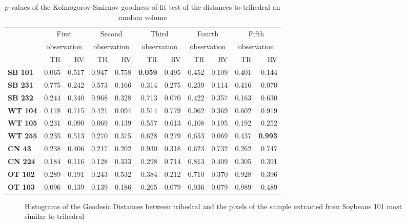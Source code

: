 \documentclass[12pt]{article}
\begin{document}
\begin{table}[hbt]
\centering
\caption{$p$-values of the Kolmogorov-Smirnov goodness-of-fit test of the distances to trihedral an random volume}\label{tab:pvalues_table}
\begin{tabular}{lrrrrrrrrrr}

\toprule
& \multicolumn{2}{c}{First} & \multicolumn{2}{c}{Second} & \multicolumn{2}{c}{Third} & \multicolumn{2}{c}{Fourth} & \multicolumn{2}{c}{Fifth}\\
& \multicolumn{2}{c}{observation} & \multicolumn{2}{c}{observation} & \multicolumn{2}{c}{observation} & \multicolumn{2}{c}{observation} & \multicolumn{2}{c}{observation}\\
& TR & RV & TR & RV & TR & RV & TR & RV& TR & RV\\
\cmidrule(lr){2-11}
\textbf{SB 101} & 0.065 & 0.517 & 0.947 & 0.758 & \textbf{0.059} & 0.495 & 0.452 & 0.109 & 0.401 & 0.144\\
\textbf{SB 231} & 0.775 & 0.242 & 0.573 & 0.166 & 0.314 & 0.275 & 0.239 & 0.114 & 0.416 & 0.070\\
\textbf{SB 232} & 0.244 & 0.340 & 0.968 & 0.328 & 0.713 & 0.070 & 0.422 & 0.357 & 0.163 & 0.630\\
\textbf{WT 104} & 0.178 & 0.715 & 0.421 & 0.094 & 0.514 & 0.779 & 0.062 & 0.369 & 0.602 & 0.919\\
\textbf{WT 105} & 0.231 & 0.090 & 0.069 & 0.139 & 0.557 & 0.613 & 0.108 & 0.195 & 0.192 & 0.252\\
\textbf{WT 255} & 0.235 & 0.513 & 0.270 & 0.375 & 0.628 & 0.279 & 0.653 & 0.069 & 0.437 & \textbf{0.993}\\
\textbf{CN 43}  & 0.238 & 0.406 & 0.217 & 0.202 & 0.930 & 0.318 & 0.623 & 0.732 & 0.262 & 0.747\\
\textbf{CN 224} & 0.184 & 0.116 & 0.128 & 0.333 & 0.298 & 0.714 & 0.813 & 0.409 & 0.305 & 0.391\\
\textbf{OT 102} & 0.289 & 0.191 & 0.243 & 0.532 & 0.384 & 0.212 & 0.710 & 0.370 & 0.928 & 0.396\\
\textbf{OT 103} & 0.096 & 0.139 & 0.139 & 0.186 & 0.265 & 0.079 & 0.936 & 0.079 & 0.989 & 0.489\\
\bottomrule
\end{tabular} 
\end{table}

\begin{figure}[hbt]
\centering
{}
\caption{Histograms of the Geodesic Distances between trihedral and the pixels of the sample extracted from Soybeans 101 most similar to trihedral}
\label{fig:sb101_hist_tri}
\end{figure}
\end{document}
